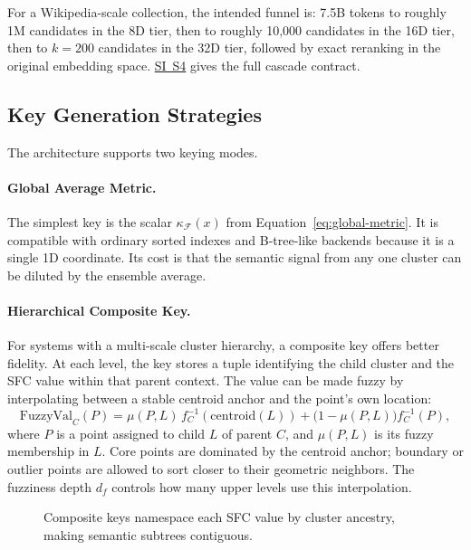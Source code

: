 \documentclass[11pt]{article}
\newcommand{\kappaf}{\kappa_{\mathcal F}}
\begin{document}
For a Wikipedia-scale collection, the intended funnel is: 7.5B tokens to roughly 1M candidates in the 8D tier, then to roughly 10,000 candidates in the 16D tier, then to $k=200$ candidates in the 32D tier, followed by exact reranking in the original embedding space. \hyperref[sec:si-cascade]{SI~S4} gives the full cascade contract.

\subsection{Key Generation Strategies}
The architecture supports two keying modes.

\paragraph{Global Average Metric.}
The simplest key is the scalar $\kappaf(x)$ from Equation~\ref{eq:global-metric}. It is compatible with ordinary sorted indexes and B-tree-like backends because it is a single 1D coordinate. Its cost is that the semantic signal from any one cluster can be diluted by the ensemble average.

\paragraph{Hierarchical Composite Key.}
For systems with a multi-scale cluster hierarchy, a composite key offers better fidelity. At each level, the key stores a tuple identifying the child cluster and the SFC value within that parent context. The value can be made fuzzy by interpolating between a stable centroid anchor and the point's own location:
\begin{equation}
\mathrm{FuzzyVal}_C(P)=\mu(P,L)\, f_C^{-1}(\mathrm{centroid}(L))+\bigl(1-\mu(P,L)\bigr) f_C^{-1}(P),
\label{eq:fuzzy-key}
\end{equation}
where $P$ is a point assigned to child $L$ of parent $C$, and $\mu(P,L)$ is its fuzzy membership in $L$. Core points are dominated by the centroid anchor; boundary or outlier points are allowed to sort closer to their geometric neighbors. The fuzziness depth $d_f$ controls how many upper levels use this interpolation.

\begin{figure}[t]
    \centering
    \caption{Composite keys namespace each SFC value by cluster ancestry, making semantic subtrees contiguous.}
    \label{fig:hierarchical-key}
\end{figure}
\end{document}
